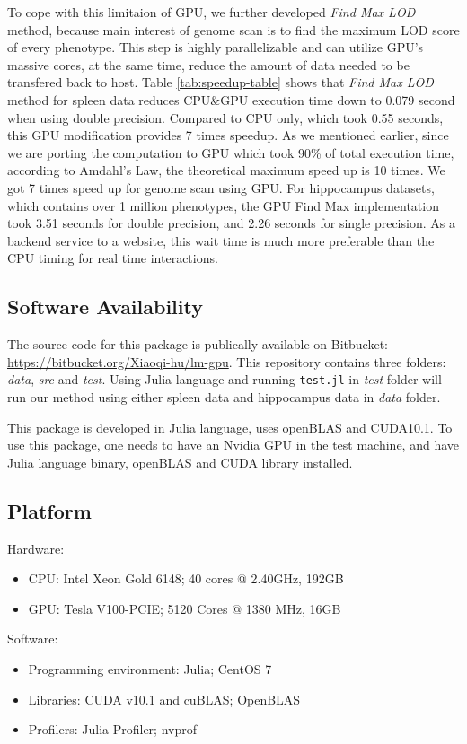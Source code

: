 \documentclass[9pt,twocolumn,twoside,lineno]{gsag3jnl}
\newcommand{\code}{\texttt}
\begin{document}
To cope with this limitaion of GPU, we further developed \textit{Find Max LOD} method, because main interest of genome scan is to find the maximum LOD score of every phenotype. 
This step is highly parallelizable and can utilize GPU's massive cores, at the same time, reduce the amount of data needed to be transfered back to host. 
Table \ref{tab:speedup-table} shows that \textit{Find Max LOD} method for spleen data reduces CPU\&GPU execution time down to 0.079 second when using double precision. 
Compared to CPU only, which took 0.55 seconds, this GPU modification provides 7 times speedup. 
As we mentioned earlier, since we are porting the computation to GPU which took 90\% of total execution time, according to Amdahl's Law, the theoretical maximum speed up is 10 times. 
We got 7 times speed up for genome scan using GPU. 
For hippocampus datasets, which contains over 1 million phenotypes, the GPU Find Max implementation took 3.51 seconds for double precision, and 2.26 seconds for single precision. 
As a backend service to a website, this wait time is much more preferable than the CPU timing for real time interactions. 

\subsection{Software Availability}
The source code for this package is publically available on Bitbucket: \url{https://bitbucket.org/Xiaoqi-hu/lm-gpu}.
This repository contains three folders: \textit{data}, \textit{src} and \textit{test}. 
Using Julia language and running \code{test.jl} in \textit{test} folder will run our method using either spleen data and hippocampus data in \textit{data} folder. 

This package is developed in Julia language, uses openBLAS and CUDA10.1. 
To use this package, one needs to have an Nvidia GPU in the test machine,
and have Julia language binary, openBLAS and CUDA library installed. 

\subsection{Platform}
Hardware:
 \begin{itemize}
	\item CPU: Intel Xeon Gold 6148; 40 cores @ 2.40GHz, 192GB 
	\item GPU: Tesla V100-PCIE; 5120 Cores @ 1380 MHz, 16GB
\end{itemize}
Software: 
\begin{itemize}
	\item Programming environment: Julia; CentOS 7
	\item Libraries: CUDA v10.1 and cuBLAS; OpenBLAS
	\item Profilers: Julia Profiler; nvprof
\end{itemize}
\end{document}
